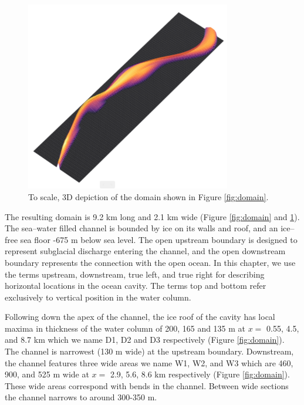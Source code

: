 \begin{figure}[!ht]
\centering
\includegraphics[width=0.8\textwidth]{chapters/4/3d_domain.png}
\caption[Domain]{To scale, 3D depiction of the domain shown in Figure \ref{fig:domain}. }
\label{fig:3d_domain}
\end{figure}

The resulting domain is 9.2 km long and 2.1 km wide (Figure \ref{fig:domain} and \ref{fig:3d_domain}). The sea--water filled channel is bounded by ice on its walls and roof, and an ice--free sea floor -675 m below sea level. The open upstream boundary is designed to represent subglacial discharge entering the channel, and the open downstream boundary represents the connection with the open ocean. In this chapter, we use the terms upstream, downstream, true left, and true right for describing horizontal locations in the ocean cavity. 
The terms top and bottom refer exclusively to vertical position in the water column.

Following down the apex of the channel, the ice roof of the cavity has local maxima in thickness of the water column of 200, 165 and 135 m at $x=$ 0.55, 4.5, and 8.7 km which we name D1, D2 and D3 respectively (Figure \ref{fig:domain}). The channel is narrowest (130 m wide) at the upstream boundary. Downstream, the channel features three wide areas we name W1, W2, and W3 which are 460, 900, and 525 m wide at $x =$ 2.9, 5.6, 8.6 km respectively (Figure \ref{fig:domain}). These wide areas correspond with bends in the channel. Between wide sections the channel narrows to around 300-350 m. 


